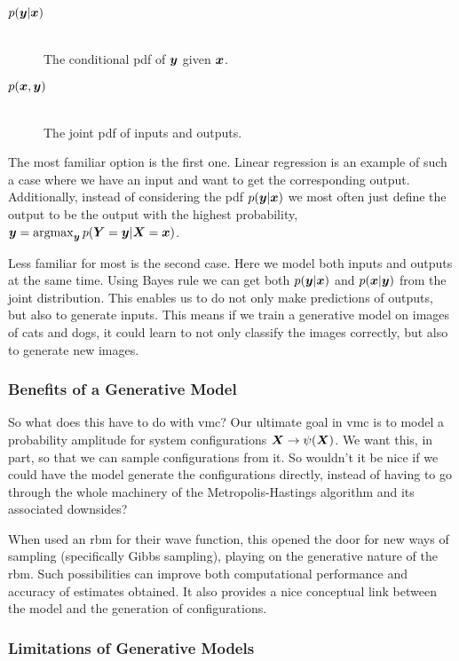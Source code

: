 \documentclass[Thesis.tex]{subfiles}
\begin{document}
\begin{description}
\item[$p(\bm{y} | \bm{x})$]\hfill\\
  The conditional \gls{pdf} of $\bm{y}$ given $\bm{x}$.
\item[$p(\bm{x}, \bm{y})$] \hfill\\
  The joint \gls{pdf} of inputs and outputs.
\end{description}
The most familiar option is the first one. Linear regression is an example of
such a case where we have an input and want to get the corresponding output.
Additionally, instead of considering the \gls{pdf} $p(\bm{y}|\bm{x})$ we
most often just define the output to be the output with the highest probability,
$\bm{y} = \operatorname*{argmax}_{\bm{y}}p(\bm{Y} = \bm{y} | \bm{X} = \bm{x})$.

Less familiar for most is the second case. Here we model both inputs and outputs
at the same time. Using Bayes rule we can get both $p(\bm{y}|\bm{x})$ and $p(\bm{x} |
\bm{y})$ from the joint distribution. This enables us to do not only make predictions of
outputs, but also to generate inputs. This means if we train a generative model
on images of cats and dogs, it could learn to not only classify the images
correctly, but also to generate new images.

\subsubsection{Benefits of a Generative Model}

So what does this have to do with \gls{vmc}? Our ultimate
goal in \gls{vmc} is to model a probability amplitude for system configurations
$\bm{X}\rightarrow \psi(\bm{X})$. We want this, in part, so that we can sample
configurations from it. So wouldn't it be nice if we could have the model
generate the configurations directly, instead of having to go through the whole
machinery of the Metropolis-Hastings algorithm and its associated downsides?

When \textcite{Carleo602} used an \gls{rbm} for their wave function, this opened the
door for new ways of sampling (specifically Gibbs sampling), playing on the
generative nature of the \gls{rbm}. Such possibilities can improve both computational
performance and accuracy of estimates obtained. It also provides a nice
conceptual link between the model and the generation of configurations.

\subsubsection{Limitations of Generative Models}
\end{document}
